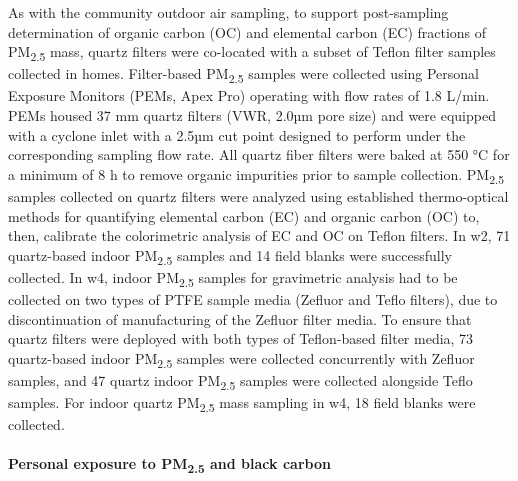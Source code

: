\documentclass[
  letterpaper,
  DIV=11,
  numbers=noendperiod]{scrartcl}
\let\oldparagraph\paragraph
\renewcommand{\paragraph}[1]{\oldparagraph{#1}\mbox{}}
\providecommand{\DIFaddbegin}{} %
\providecommand{\DIFaddend}{} %
\providecommand{\DIFdelbegin}{} %
\providecommand{\DIFdelend}{} %
\newcommand{\DIFscaledelfig}{0.5}
\newlength{\DIFdelgraphicswidth} %
\newlength{\DIFdelgraphicsheight} %
\newcommand{\DIFaddincludegraphics}[2][]{{\color{blue}\fbox{\DIFOincludegraphics[#1]{#2}}}} %
\newcommand{\DIFdelincludegraphics}[2][]{%
\sbox{\DIFdelgraphicsbox}{\DIFOincludegraphics[#1]{#2}}%
\settoboxwidth{\DIFdelgraphicswidth}{\DIFdelgraphicsbox} %
\settoboxtotalheight{\DIFdelgraphicsheight}{\DIFdelgraphicsbox} %
\scalebox{\DIFscaledelfig}{%
\parbox[b]{\DIFdelgraphicswidth}{\usebox{\DIFdelgraphicsbox}\\[-\baselineskip] \rule{\DIFdelgraphicswidth}{0em}}\llap{\resizebox{\DIFdelgraphicswidth}{\DIFdelgraphicsheight}{%
\setlength{\unitlength}{\DIFdelgraphicswidth}%
\begin{picture}(1,1)%
\thicklines\linethickness{2pt} %
{\color[rgb]{1,0,0}\put(0,0){\framebox(1,1){}}}%
{\color[rgb]{1,0,0}\put(0,0){\line( 1,1){1}}}%
{\color[rgb]{1,0,0}\put(0,1){\line(1,-1){1}}}%
\end{picture}%
}\hspace*{3pt}}} %
} %
\DeclareRobustCommand{\DIFaddbegin}{\DIFOaddbegin \let\includegraphics\DIFaddincludegraphics} %
\DeclareRobustCommand{\DIFaddend}{\DIFOaddend \let\includegraphics\DIFOincludegraphics} %
\DeclareRobustCommand{\DIFdelbegin}{\DIFOdelbegin \let\includegraphics\DIFdelincludegraphics} %
\DeclareRobustCommand{\DIFdelend}{\DIFOaddend \let\includegraphics\DIFOincludegraphics} %
\begin{document}
As with the community outdoor air sampling, to support post-sampling
determination of organic carbon (OC) and elemental carbon (EC) fractions
of PM\textsubscript{2.5} mass, quartz filters were co-located with a
subset of Teflon filter samples collected in homes. Filter-based
PM\textsubscript{2.5} samples were collected using Personal Exposure
Monitors (PEMs, Apex Pro) operating with flow rates of 1.8 L/min. PEMs
housed 37 mm quartz filters (VWR, 2.0µm pore size) and were equipped
with a cyclone inlet with a 2.5µm cut point designed to perform under
the corresponding sampling flow rate. All quartz fiber filters were
baked at 550 °C for a minimum of 8 h to remove organic impurities prior
to sample collection. PM\textsubscript{2.5} samples collected on quartz
filters were analyzed using established thermo-optical methods for
quantifying elemental carbon (EC) and organic carbon (OC) to, then,
calibrate the colorimetric analysis of EC and OC on Teflon filters. In
w2, 71 quartz-based indoor PM\textsubscript{2.5} samples and 14 field
blanks were successfully collected. In w4, indoor PM\textsubscript{2.5}
samples for gravimetric analysis had to be collected on two types of
PTFE sample media (Zefluor and Teflo filters), due to discontinuation of
manufacturing of the Zefluor filter media. To ensure that quartz filters
were deployed with both types of Teflon-based filter media, 73
quartz-based indoor PM\textsubscript{2.5} samples were collected
concurrently with Zefluor samples, and 47 quartz indoor
PM\textsubscript{2.5} samples were collected alongside Teflo samples.
For indoor quartz PM\textsubscript{2.5} mass sampling in w4, 18 field
blanks were collected.

\DIFdelbegin %
\DIFdelend \DIFaddbegin \paragraph{\texorpdfstring{Personal exposure to PM\textsubscript{2.5}
and black
carbon}{Personal exposure to PM2.5 and black carbon}}\label{personal-exposure-to-pm2.5-and-black-carbon}
\DIFaddend 
\end{document}
